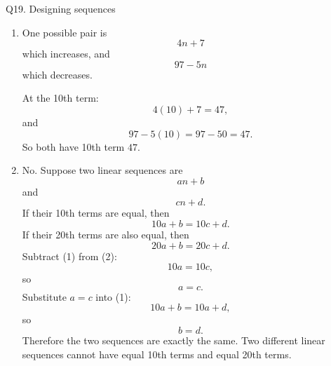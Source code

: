 \documentclass[11pt,a4paper]{article}
\begin{document}
\begin{solbox}{Q19. Designing sequences}
\begin{enumerate}[label=(\alph*)]
\item One possible pair is
\[
\boxed{4n+7}
\]
which increases, and
\[
\boxed{97-5n}
\]
which decreases.

At the 10th term:
\[
4(10)+7=47,
\]
and
\[
97-5(10)=97-50=47.
\]
So both have 10th term \(47\).

\item No. Suppose two linear sequences are
\[
an+b
\]
and
\[
cn+d.
\]
If their 10th terms are equal, then
\[
10a+b=10c+d. \tag{1}
\]
If their 20th terms are also equal, then
\[
20a+b=20c+d. \tag{2}
\]
Subtract (1) from (2):
\[
10a=10c,
\]
so
\[
a=c.
\]
Substitute \(a=c\) into (1):
\[
10a+b=10a+d,
\]
so
\[
b=d.
\]
Therefore the two sequences are exactly the same. Two different linear sequences cannot have equal 10th terms and equal 20th terms.
\end{enumerate}
\end{solbox}
\end{document}
